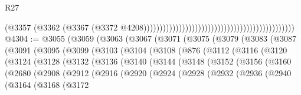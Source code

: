 \begin{lexlean}{R27}
\begin{coremodule}
                                                                                          (@3357
                                                                                            (@3362
                                                                                              (@3367
                                                                                                (@3372
                                                                                                  @4208)))))))))))))))))))))))))))))))))))))))))))))))
@4304 := @3055
    (@3059
      (@3063
        (@3067
          (@3071
            (@3075
              (@3079
                (@3083
                  (@3087
                    (@3091
                      (@3095
                        (@3099
                          (@3103
                            (@3104
                              (@3108
                                (@876
                                  (@3112
                                    (@3116
                                      (@3120
                                        (@3124
                                          (@3128
                                            (@3132
                                              (@3136
                                                (@3140
                                                  (@3144
                                                    (@3148
                                                      (@3152
                                                        (@3156
                                                          (@3160
                                                            (@2680
                                                              (@2908
                                                                (@2912
                                                                  (@2916
                                                                    (@2920
                                                                      (@2924
                                                                        (@2928
                                                                          (@2932
                                                                            (@2936
                                                                              (@2940
                                                                                (@3164
                                                                                  (@3168
                                                                                    (@3172

\end{coremodule}
\end{lexlean}
